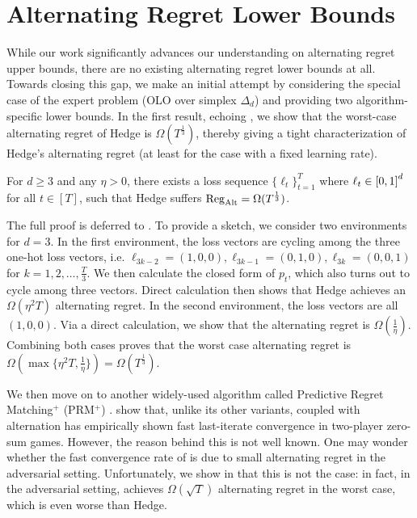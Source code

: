 \section{Alternating Regret Lower Bounds}\label{sec: lower_bound}

While our work significantly advances our understanding on alternating regret upper bounds, 
there are no existing alternating regret lower bounds at all.
Towards closing this gap, we make an initial attempt by considering the special case of the expert problem (OLO over simplex $\Delta_d$) and providing two algorithm-specific lower bounds.
In the first result, 
echoing , 
we show that the worst-case alternating regret of Hedge is $\Omega(T^{\frac{1}{3}})$, 
thereby giving a tight characterization of Hedge's alternating regret (at least for the case with a fixed learning rate).

\begin{theorem}\label{thm:hedge_lower_bound}
   For $d\ge 3$ and any $\eta>0$, there exists a loss sequence $\{\ell_t\}_{t=1}^T$ where $\ell_t\in\left[0,1\right]^d$ for all $t\in[T]$, such that Hedge suffers $\mathrm{Reg}_{\mathrm{Alt}}=
    \Omega(T^{\frac{1}{3}})$.
\end{theorem}
The full proof is deferred to . To provide a sketch, we consider two environments for $d=3$. In the first environment, the loss vectors are cycling among the three one-hot loss vectors, i.e. $\ell_{3k-2}=(1,0,0),\ell_{3k-1}=(0,1,0),\ell_{3k}=(0,0,1)$ for $k=1,2,\dots,\frac{T}{3}$. We then calculate the closed form of $p_t$, which also turns out to cycle among three vectors. Direct calculation then shows that Hedge achieves an $\Omega(\eta^2 T)$ alternating regret. In the second environment, the loss vectors are all $(1,0,0)$. Via a direct calculation, we show that the alternating regret is $\Omega(\frac{1}{\eta})$. Combining both cases proves 
that the worst case alternating regret is $\Omega(\max\{\eta^2 T, \frac{1}{\eta}\}) = \Omega(T^{\frac{1}{3}})$.

We then move on to another widely-used algorithm called Predictive Regret Matching$^+$ (PRM$^+$) \citep{farina2021faster}. \citet{cai2023last} show that, unlike its other variants, \PRM coupled with alternation has empirically shown fast last-iterate convergence in two-player zero-sum games. However, the reason behind this is not well known. %
One may wonder whether the fast convergence rate of \PRM is due to small alternating regret in the adversarial setting. Unfortunately, we show in  that this is not the case: in fact, in the adversarial setting, \PRM achieves $\Omega(\sqrt{T})$ alternating regret in the worst case, which is even worse than Hedge.

